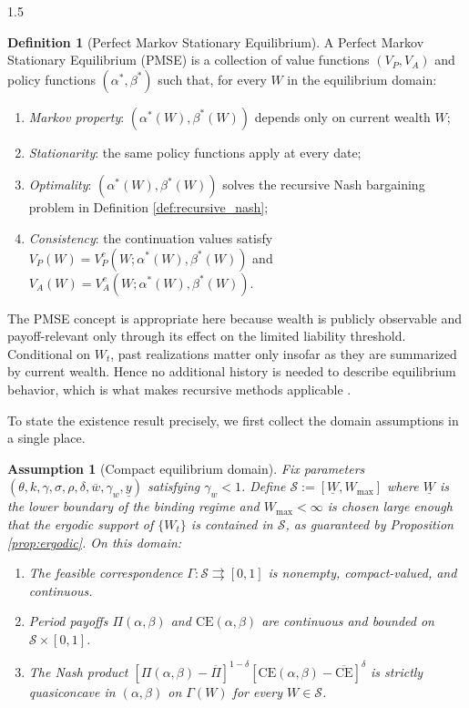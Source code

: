 \documentclass[12pt]{article}
\newtheorem{assumption}{Assumption}[section]
\theoremstyle{definition}
\newtheorem{definition}{Definition}[section]
\theoremstyle{plain}
\begin{document}
\begin{spacing}{1.5}
\begin{definition}[Perfect Markov Stationary Equilibrium]\label{def:pmse}
A Perfect Markov Stationary Equilibrium (PMSE) \parencite{maskin1994, fudenberg1991} is a collection of value functions $(V_P,V_A)$ and policy functions $(\alpha^*,\beta^*)$ such that, for every $W$ in the equilibrium domain:
\begin{enumerate}
    \item \textit{Markov property}: $(\alpha^*(W),\beta^*(W))$ depends only on current wealth $W$;
    \item \textit{Stationarity}: the same policy functions apply at every date;
    \item \textit{Optimality}: $(\alpha^*(W),\beta^*(W))$ solves the recursive Nash bargaining problem in Definition \ref{def:recursive_nash};
    \item \textit{Consistency}: the continuation values satisfy $V_P(W)=V_P^{c}(W;\alpha^*(W),\beta^*(W))$ and $V_A(W)=V_A^{c}(W;\alpha^*(W),\beta^*(W))$.
\end{enumerate}
\end{definition}

The PMSE concept is appropriate here because wealth is publicly observable and payoff-relevant only through its effect on the limited liability threshold. Conditional on $W_t$, past realizations matter only insofar as they are summarized by current wealth. Hence no additional history is needed to describe equilibrium behavior, which is what makes recursive methods applicable \parencite{stokey1989}.

To state the existence result precisely, we first collect the domain assumptions in a single place.

\begin{assumption}[Compact equilibrium domain]\label{ass:compact_domain}
Fix parameters $(\theta, k, \gamma, \sigma, \rho, \delta, \overline{w}, \gamma_w, \underline{y})$ satisfying $\gamma_w < 1$. Define $\mathcal{S} := [\underline{W}, W_{\max}]$ where $\underline{W}$ is the lower boundary of the binding regime and $W_{\max} < \infty$ is chosen large enough that the ergodic support of $\{W_t\}$ is contained in $\mathcal{S}$, as guaranteed by Proposition \ref{prop:ergodic}. On this domain:
\begin{enumerate}
    \item The feasible correspondence $\Gamma : \mathcal{S} \rightrightarrows [0,1]$ is nonempty, compact-valued, and continuous.
    \item Period payoffs $\Pi(\alpha,\beta)$ and $\mathrm{CE}(\alpha,\beta)$ are continuous and bounded on $\mathcal{S} \times [0,1]$.
    \item The Nash product $[\Pi(\alpha,\beta) - \overline{\Pi}]^{1-\delta}[\mathrm{CE}(\alpha,\beta) - \overline{\text{CE}}]^{\delta}$ is strictly quasiconcave in $(\alpha,\beta)$ on $\Gamma(W)$ for every $W \in \mathcal{S}$.
\end{enumerate}
\end{assumption}


\end{spacing}
\end{document}
